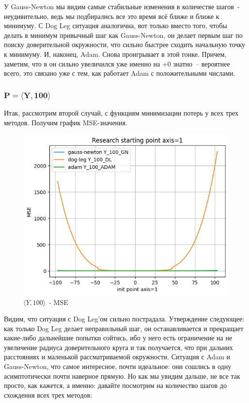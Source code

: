 \documentclass[12pt, a4paper, oneside, final]{article}
\begin{document}
	У Gauss-Newton мы видим самые стабильные изменения в количестве шагов~- неудивительно, ведь мы подбирались все это время всё ближе и ближе к минимуму.
	С Dog Leg ситуация аналогична, вот только вместо того, чтобы делать в минимум привычный шаг как Gauss-Newton, он делает первым шаг по поиску доверительной окружности, что сильно быстрее сходить начальную точку к минимуму.
	И, наконец, Adam.
	Снова проигрывает в этой гонке.
	Причем, заметим, что в он сильно увеличился уже именно на $+0$ знатно~-- вероятнее всего, это связано уже с тем, как работает Adam с положительными числами.
	\subsubsection*{$\mathbf{P = \langle Y, 100 \rangle}$}
	Итак, рассмотрим второй случай, с функциям минимизации потерь у всех трех методов.
	Получим график MSE-значения.
	\begin{figure}[H]
		\centering
		\includegraphics[scale = 0.55]{Image/T1_Y_100_MSE.png}
		\caption*{$\langle Y, 100 \rangle$~- MSE}
	\end{figure}
	Видим, что ситуация с Dog Leg'ом сильно пострадала.
	Утверждение следующее: как только Dog Leg делает неправильный шаг, он останавливается и прекращает какие-либо дальнейшие попытки сойтись, ибо у него есть ограничение на не увеличение радиуса доверительного круга и так получается, что при дальних расстояниях и маленькой рассматриваемой окружности.
	Ситуация с Adam и Gauss-Newton, что самое интересное, почти идеальное: они сошлись в одну асимптотически почти наверное прямую.
	Но как мы увидим дальше, не все так просто, как кажется, а именно: давайте посмотрим на количество шагов до схождения всех трех методов:
\end{document}
